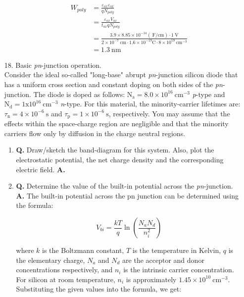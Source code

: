 \documentclass[main.tex]{subfiles}
\begin{document}
\begin{enumerate}
\begin{enumerate}
        $$
        \begin{aligned}
        W_{poly} &= \frac{\varepsilon_{ox} \varepsilon_{ox}}{q N_{poly}}\\
        &= \frac{\varepsilon_{ox} V_{ox}}{t_{ox} q N_{poly}} \\
        &= \frac{3.9 \times 8.85 \times 10^{-14}(\mathrm{~F} / \mathrm{cm}) \cdot 1 \mathrm{~V}}{2 \times 10^{-7} \mathrm{~cm} \cdot 1.6 \times 10^{-19} \mathrm{C} \cdot 8 \times 10^{19} \mathrm{~cm}^{-3}} \\
        & =1.3 \mathrm{~nm}
        \end{aligned}
        $$
        
    \end{enumerate}
    


\item [18.] Basic \textit{pn}-junction operation.\\

Consider the ideal so-called "long-base" abrupt \textit{pn}-junction silicon diode that has a uniform cross section and constant doping on both sides of the \textit{pn}-junction. The diode is doped as follows: $\mathrm{N}_{\mathrm{a}}=8.0 \times 10^{16} \mathrm{~cm}^{-3}$ \textit{p}-type and $\mathrm{N}_{\mathrm{d}}=1 \mathrm{x} 10^{16} \mathrm{~cm}^{-3}$ \textit{n}-type. For this material, the minority-carrier lifetimes are: $\tau_{\mathrm{n}}=4 \times 10^{-6} \mathrm{~s}$ and $\tau_{\mathrm{p}}=1 \times 10^{-6} \mathrm{~s}$, respectively. You may assume that the effects within the space-charge region are negligible and that the minority carriers flow only by diffusion in the charge neutral regions.

    \begin{enumerate}
        \item \textbf{Q.} Draw/sketch the band-diagram for this system. Also, plot the electrostatic potential, the net charge density and the corresponding electric field. \textbf{A.}
        
        \item \textbf{Q.} Determine the value of the built-in potential across the \textit{pn}-junction. \textbf{A.} The built-in potential across the pn junction can be determined using the formula:
        
        $$
        V_{b i}=\frac{k T}{q} \ln \left(\frac{N_a N_d}{n_i^2}\right)
        $$
        
        where $k$ is the Boltzmann constant, $T$ is the temperature in Kelvin, $q$ is the elementary charge, $N_a$ and $N_d$ are the acceptor and donor concentrations respectively, and $n_i$ is the intrinsic carrier concentration. For silicon at room temperature, $n_i$ is approximately $1.45 \times 10^{10} \mathrm{~cm}^{-3}$. Substituting the given values into the formula, we get:
        

\end{enumerate}
\end{enumerate}
\end{document}
